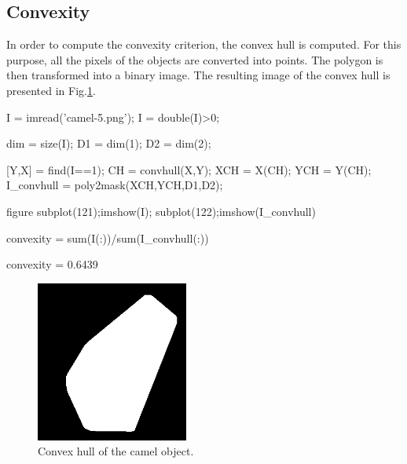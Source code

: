 \subsection{Convexity}
In order to compute the convexity criterion, the convex hull is computed. For this purpose, all the pixels of the objects are converted into points. The polygon is then transformed into a binary image. The resulting image of the convex hull is presented in Fig.\ref{fig:image_characterization:matlab:convhull}.
\begin{matlab}
I = imread('camel-5.png');
I = double(I)>0;

dim = size(I);
D1  = dim(1);
D2  = dim(2);

[Y,X] = find(I==1);
CH = convhull(X,Y);
XCH = X(CH);
YCH = Y(CH);
I_convhull = poly2mask(XCH,YCH,D1,D2);

figure
subplot(121);imshow(I);
subplot(122);imshow(I_convhull)

convexity = sum(I(:))/sum(I_convhull(:))
\end{matlab}
\begin{mwindow}
convexity = 0.6439
\end{mwindow}

\begin{figure}[htbp]
\centering
\includegraphics[width=5cm]{convhull_camel.png}
 \caption{Convex hull of the camel object.}
 \label{fig:image_characterization:matlab:convhull}
\end{figure}
